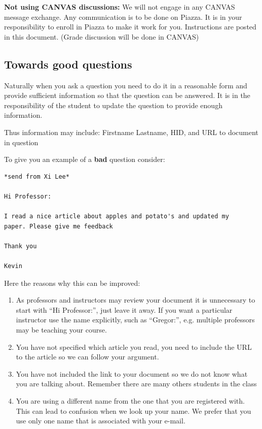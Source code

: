 \textbf{Not using CANVAS discussions:} We will not engage in any CANVAS
message exchange. Any communication is to be done on Piazza. It is in
your responsibility to enroll in Piazza to make it work for you.
Instructions are posted in this document. (Grade discussion will be
done in CANVAS)

\subsection{Towards good questions}

Naturally when you ask a question you need to do it in a reasonable form
and provide sufficient information so that the question can be answered.
It is in the responsibility of the student to update the question to
provide enough information.

Thus information may include: Firstname Lastname, HID, and URL
to document in question

To give you an example of a \textbf{bad} question consider:

\begin{verbatim}
*send from Xi Lee*

Hi Professor:

I read a nice article about apples and potato's and updated my
paper. Please give me feedback

Thank you

Kevin
\end{verbatim}

Here the reasons why this can be improved:

\begin{enumerate}
\item
  As professors and instructors may review your document it is
  unnecessary to start with ``Hi Professor:'', just leave it away. If
  you want a particular instructor use the name explicitly, such as
  ``Gregor:'', e.g. multiple professors may be teaching your course.
\item
  You have not specified which article you read, you need to include the
  URL to the article so we can follow your argument.
\item
  You have not included the link to your document so we do not know what
  you are talking about. Remember there are many others students in the
  class
\item
  You are using a different name from the one that you are registered
  with. This can lead to confusion when we look up your name. We prefer
  that you use only one name that is associated with your e-mail.
\end{enumerate}

